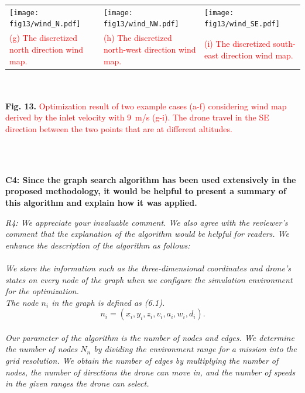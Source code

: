 \documentclass[onecolumn]{IEEEconf}
\begin{document}
\begin{description}
    \begin{mdframed}[ linewidth=.75pt, userdefinedwidth=0.9\textwidth]
    \begin{tabular}{m{}m{}m{}}
    \texttt{[image: fig13/wind\_N.pdf]}&
    \texttt{[image: fig13/wind\_NW.pdf]}&
    \texttt{[image: fig13/wind\_SE.pdf]}\\
    \small \textcolor{red}{(g) The discretized north direction wind map.} &
    \small \textcolor{red}{(h) The discretized north-west direction wind map.} &
    \small \textcolor{red}{(i) The discretized south-east direction wind map.} \\
    \end{tabular}
    ~\\
    ~\\
    \textbf{Fig. 13.} \textcolor{red}{Optimization result of two example cases (a-f) considering wind map derived by the inlet velocity with 9~m/s (g-i). 
    The drone travel in the SE direction between the two points that are at different altitudes.}
    \label{fig: wind_opt}
 \end{mdframed}       
	~\\
	~\\
    \item \textbf
    {
	C4: Since the graph search algorithm has been used extensively in the proposed methodology, it would be helpful to present a summary of this algorithm and explain how it was applied. 
	}
	\item \textit
	{
	R4: We appreciate your invaluable comment. We also agree with the reviewer's comment that the explanation of the algorithm would be helpful for readers. We enhance the description of the algorithm as follows: 
	~\\
	~\\
    We store the information such as the three-dimensional coordinates and drone’s states on every node of the graph when we configure the simulation environment for the optimization.~\\
    The node $n_i$ in the graph is defined as (6.1).
    \begin{equation*}
    n_i = (x_i, y_i, z_i, v_i, a_i, w_i, d_i). \tag{6.1} \label{eq:node}
    \end{equation*}~\\
    Our parameter of the algorithm is the number of nodes and edges. We determine the number of nodes $N_n$ by dividing the environment range for a mission into the grid resolution. We obtain the number of edges by multiplying the number of nodes, the number of directions the drone can move in, and the number of speeds in the given ranges the drone can select.
}
\end{description}
\end{document}
